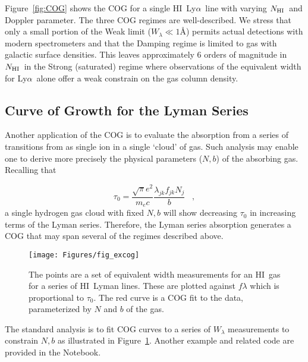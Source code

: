 \documentclass[graybox]{svmult}
\newcommand{\HI}{H{\sc I}}
\def\lya{Ly$\alpha$}
\def\cmma{\;\;\; ,}
\newcommand{\mnhi}{N_{\rm HI}}
\newcommand{\nhi}{$\mnhi$}
\begin{document}
Figure~\ref{fig:COG} shows the COG for a single
\HI\ \lya\ line with varying \nhi\ and Doppler parameter.
The three COG regimes are well-described.  We stress
that only a small portion of the Weak limit ($W_\lambda \ll 1$\AA)
permits actual detections with modern spectrometers
and that the Damping regime is limited to gas with
galactic surface densities.
This leaves approximately 6 orders of magnitude in 
\nhi\ in the Strong (saturated) regime where observations
of the equivalent width for
\lya\ alone offer a weak constrain on the gas column
density.

\subsection{Curve of Growth for the Lyman Series}

Another application of the COG is to evaluate the
absorption from a series of transitions from as 
single ion in a single `cloud' of gas.
Such analysis may enable one to derive more precisely
the physical parameters ($N,b$) of the absorbing gas.
Recalling that 

\begin{equation}
\tau_0 = \frac{\sqrt{\pi} e^2}{m_e c} \frac{\lambda_{jk} f_{jk} N_j}{b} \cmma
\end{equation}
a single hydrogen gas cloud with fixed $N,b$ will
show decreasing $\tau_0$ in increasing terms of the
Lyman series. Therefore, the Lyman series absorption 
generates a COG that may span several of the regimes
described above.

%
\begin{figure}[b]
\sidecaption
\texttt{[image: Figures/fig\_excog]}
%
%
\caption{The points are a set of equivalent width 
measurements for an \HI\ gas for a series of 
\HI\ Lyman lines.  These are plotted against $f\lambda$
which is proportional to $\tau_0$.  The red curve is a
COG fit to the data, parameterized by $N$ and $b$ of the gas.
}
\label{fig:COGfit}       %
\end{figure}


The standard analysis is to fit COG curves to a
series of $W_\lambda$ measurements to constrain $N,b$
as illustrated in Figure~\ref{fig:COGfit}.
Another example and related code are provided in the
Notebook.
\end{document}
